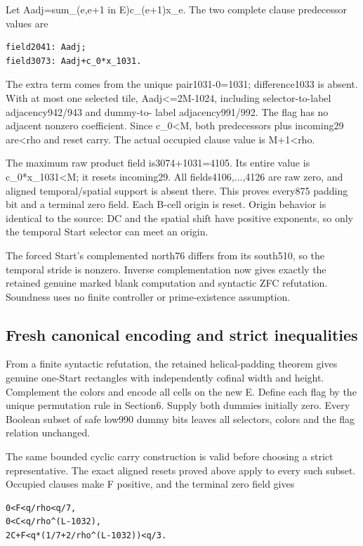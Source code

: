 Let Aadj=sum\_(e,e+1 in E)c\_(e+1)x\_e. The two complete clause predecessor values are

\begin{Verbatim}[fontsize=\small,breaklines=true,breakanywhere=true,breaksymbolleft={}]
field2041: Aadj;
field3073: Aadj+c_0*x_1031.
\end{Verbatim}

The extra term comes from the unique pair1031-0=1031; difference1033 is absent. With at most one selected tile, Aadj<=2M-1024, including selector-to-label adjacency942/943 and dummy-to- label adjacency991/992. The flag has no adjacent nonzero coefficient. Since c\_0<M, both predecessors plus incoming29 are<rho and reset carry. The actual occupied clause value is M+1<rho.

The maximum raw product field is3074+1031=4105. Its entire value is c\_0*x\_1031<M; it resets incoming29. All fields4106,...,4126 are raw zero, and aligned temporal/spatial support is absent there. This proves every875 padding bit and a terminal zero field. Each B-cell origin is reset. Origin behavior is identical to the source: DC and the spatial shift have positive exponents, so only the temporal Start selector can meet an origin.

The forced Start's complemented north76 differs from its south510, so the temporal stride is nonzero. Inverse complementation now gives exactly the retained genuine marked blank computation and syntactic ZFC refutation. Soundness uses no finite controller or prime-existence assumption.

\subsection{Fresh canonical encoding and strict inequalities}
From a finite syntactic refutation, the retained helical-padding theorem gives genuine one-Start rectangles with independently cofinal width and height. Complement the colors and encode all cells on the new E. Define each flag by the unique permutation rule in Section6. Supply both dummies initially zero. Every Boolean subset of safe low990 dummy bits leaves all selectors, colors and the flag relation unchanged.

The same bounded cyclic carry construction is valid before choosing a strict representative. The exact aligned resets proved above apply to every such subset. Occupied clauses make F positive, and the terminal zero field gives

\begin{Verbatim}[fontsize=\small,breaklines=true,breakanywhere=true,breaksymbolleft={}]
0<F<q/rho<q/7,
0<C<q/rho^(L-1032),
2C+F<q*(1/7+2/rho^(L-1032))<q/3.
\end{Verbatim}

